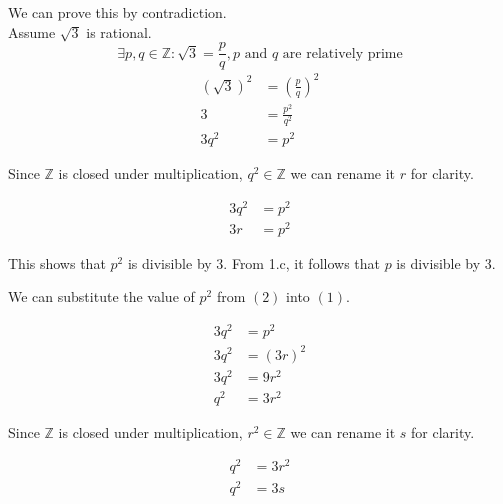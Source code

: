 \documentclass[12pt]{article}
\begin{document}
\begin{enumerate}
\begin{enumerate}
\begin{itemize}
                    We can prove this by contradiction. \\

                    Assume $\sqrt{3}$ is rational.
                    \[
                        \exists p, q \in \mathbb{Z} :
                        \sqrt{3} = \frac{p}{q},
                        p \text{ and } q \text{ are relatively prime}
                    \]
                    \begin{align*}
                        \left(\sqrt{3}\right)^2 &=
                            \left(\frac{p}{q}\right)^2 \\
                        3 &= \frac{p^2}{q^2} \\
                        3q^2 &= p^2 \tag{1}
                    \end{align*}

                    Since $\mathbb{Z}$ is closed under multiplication,
                    $q^2 \in \mathbb{Z}$ we can rename it $r$ for clarity.

                    \begin{align*}
                        3q^2 &= p^2 \\
                        3r &= p^2 \tag{2}
                    \end{align*}

                    This shows that $p^2$ is divisible by $3$.
                    From 1.c, it follows that $p$ is divisible by $3$.

                    We can substitute the value of $p^2$
                    from $(2)$ into $(1)$.

                    \begin{align*}
                        3q^2 &= p^2 \\
                        3q^2 &= \left(3r\right)^2 \\
                        3q^2 &= 9r^2 \\
                        q^2 &= 3r^2
                    \end{align*}

                    Since $\mathbb{Z}$ is closed under multiplication,
                    $r^2 \in \mathbb{Z}$ we can rename it $s$ for clarity.

                    \begin{align*}
                        q^2 &= 3r^2 \\
                        q^2 &= 3s
                    \end{align*}


\end{itemize}
\end{enumerate}
\end{enumerate}
\end{document}
